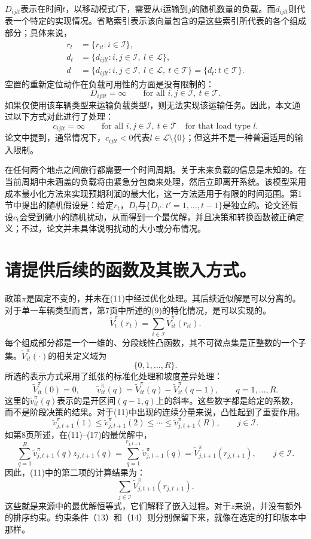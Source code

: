 \documentclass{article}
\begin{document}
$D_{ijlt}$表示在时间$t$，以移动模式$l$下，需要从$i$运输到$j$的随机数量的负载。而$d_{ijlt}$则代表一个特定的实现情况。省略索引表示该向量包含的是这些索引所代表的各个组成部分；具体来说，
\[
\begin{aligned}
r_t&=\{r_{it}:i\in\mathcal I\},\\
d_t&=\{d_{ijlt}:i,j\in\mathcal I,\ l\in\mathcal L\},\\
d&=\{d_{ijlt}:i,j\in\mathcal I,\ l\in\mathcal L,\ t\in\mathcal T\}
  =\{d_t:t\in\mathcal T\}.
\end{aligned}
\]
空置的重新定位动作在负载可用性的方面是没有限制的：
\[
D_{ij0t}=\infty
\qquad\text{for all }i,j\in\mathcal I,\ t\in\mathcal T.
\]
如果仅使用该车辆类型来运输负载类型$l$，则无法实现该运输任务。因此，本文通过以下方式对此进行了处理：
\[
c_{ijlt}=\infty
\qquad\text{for all }i,j\in\mathcal I,\ t\in\mathcal T
\quad\text{for that load type }l.
\]
论文中提到，通常情况下，$c_{ijlt}<0$代表$l\in\mathcal L\setminus\{0\}$；但这并不是一种普遍适用的输入限制。

在任何两个地点之间旅行都需要一个时间周期。关于未来负载的信息是未知的。在当前周期中未涵盖的负载将由紧急分包商来处理，然后立即离开系统。该模型采用成本最小化方法来实现预期利润的最大化，这一方法适用于有限的时间范围。第1节中提出的随机假设是：给定$r_t$，$D_t$与$\{D_{t'}:t'=1,\ldots,t-1\}$是独立的。论文还假设$c_t$会受到微小的随机扰动，从而得到一个最优解，并且决策和转换函数被正确定义；不过，论文并未具体说明扰动的大小或分布情况。

\section*{请提供后续的函数及其嵌入方式。}

政策$\pi$是固定不变的，并未在(11)中经过优化处理。其后续近似解是可以分离的。对于单一车辆类型而言，第7页中所述的(9)的特化情况，是可以实现的。
\begin{equation}
\tilde V^\pi_t(r_t)=\sum_{i\in\mathcal I}\tilde V^\pi_{it}(r_{it}).
\tag{9, single type}
\end{equation}
每个组成部分都是一个一维的、分段线性凸函数，其不可微点集是正整数的一个子集。$\tilde V^\pi_{it}(\cdot)$的相关定义域为
\[
\{0,1,\ldots,R\}.
\]
所选的表示方式采用了纸张的标准化处理和坡度差异处理：
\[
\tilde V^\pi_{it}(0)=0,\qquad
\tilde v^\pi_{it}(q)=\tilde V^\pi_{it}(q)-\tilde V^\pi_{it}(q-1),
\qquad q=1,\ldots,R.
\]
这里的$\tilde v^\pi_{it}(q)$表示的是开区间$(q-1,q)$上的斜率。这些数字都是给定的系数，而不是阶段决策的结果。对于(11)中出现的连续分量来说，凸性起到了重要作用。
\[
\tilde v^\pi_{j,t+1}(1)\leq\tilde v^\pi_{j,t+1}(2)
\leq\cdots\leq\tilde v^\pi_{j,t+1}(R),
\qquad j\in\mathcal I.
\]
如第8页所述，在(11)--(17)的最优解中，
\[
\sum_{q=1}^{R}\tilde v^\pi_{j,t+1}(q)z_{j,t+1}(q)
=\sum_{q=1}^{r_{j,t+1}}\tilde v^\pi_{j,t+1}(q)
=\tilde V^\pi_{j,t+1}(r_{j,t+1}),
\qquad j\in\mathcal I.
\]
因此，(11)中的第二项的计算结果为：
\[
\sum_{j\in\mathcal I}\tilde V^\pi_{j,t+1}(r_{j,t+1}).
\]
这些就是来源中的最优解恒等式，它们解释了嵌入过程。对于$z$来说，并没有额外的排序约束。约束条件（13）和（14）则分别保留下来，就像在选定的打印版本中那样。
\end{document}

